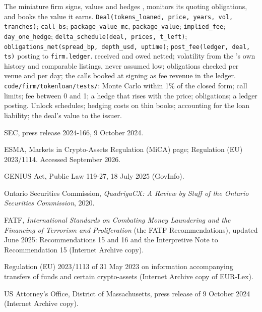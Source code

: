 \begin{build}
 The miniature firm signs, values and hedges , monitors its quoting obligations, and books the value it earns.
 \texttt{Deal(tokens\_loaned, price, years, vol, tranches)}; \texttt{call\_bs}; \texttt{package\_value\_mc}, \texttt{package\_value};
\texttt{implied\_fee}; \texttt{day\_one\_hedge}; \texttt{delta\_schedule(deal, prices, t\_left)}; \texttt{obligations\_met(spread\_bp, depth\_usd, uptime)};
\texttt{post\_fee(ledger, deal, ts)} posting to \texttt{firm.ledger}.
  received and owed netted; volatility from the 's own history and comparable listings, never assumed low; obligations checked per venue
and per day; the calls booked at signing as fee revenue in the ledger.
 \texttt{code/firm/tokenloan/tests/}: Monte Carlo within 1\% of the closed form; call limits; fee between 0 and 1; a hedge that rises with the
price; obligations; a ledger posting.
 Unlock schedules; hedging costs on thin books; accounting for the loan liability; the deal's value to the issuer.
\end{build}

\begin{omsources}
\item SEC, press release 2024-166, 9 October 2024.
\item ESMA, Markets in Crypto-Assets Regulation (MiCA) page; Regulation (EU) 2023/1114. Accessed September 2026.
\item GENIUS Act, Public Law 119-27, 18 July 2025 (GovInfo).
\item Ontario Securities Commission, \emph{QuadrigaCX: A Review by Staff of the Ontario Securities Commission}, 2020.
\item FATF, \emph{International Standards on Combating Money Laundering and the Financing of Terrorism and Proliferation} (the FATF Recommendations),
updated June 2025: Recommendations 15 and 16 and the Interpretive Note to Recommendation 15 (Internet Archive copy).
\item Regulation (EU) 2023/1113 of 31 May 2023 on information accompanying transfers of funds and certain crypto-assets (Internet Archive copy of EUR-Lex).
\item US Attorney's Office, District of Massachusetts, press release of 9 October 2024 (Internet Archive copy).
\end{omsources}

